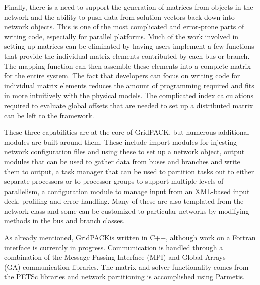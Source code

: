 \documentclass[preprint]{acm_proc_article-sp}
\begin{document}
Finally, there is a need to support the generation of matrices from objects in the
network and the ability to push data from solution vectors back down into
network objects. This is one of the most complicated and error-prone parts of
writing code, especially for parallel platforms. Much of the work involved in
setting up matrices can be eliminated by having users implement a few functions
that provide the individual matrix elements contributed by each bus or branch. The
mapping function can then assemble these elements into a complete matrix for the
entire system. The fact that developers can focus on writing code for individual
matrix elements reduces the amount of programming required and fits in more
intuitively with the physical models. The complicated index calculations
required to evaluate global offsets that are needed to set up a distributed
matrix can be left to the framework.

These three capabilities are at the core of GridPACK\texttrademark, but numerous
additional modules are built around them. These include import modules for injesting
network configuration files and using these to set up a network object, output
modules that can be used to gather data from buses and branches and write them
to output, a task manager that can be used to partition tasks out to either separate
processors or to processor groups to support multiple levels of parallelism, a
configuration module to manage input from an XML-based input deck, profiling and
error handling. Many of these are also templated from the network class  and
some can be customized to particular networks by modifying methods in the bus
and branch classes.

As already mentioned, GridPACK\texttrademark is written in C++, although work
on a Fortran interface is currently in progress. Communication is handled
through a combination of the Message Passing Interface (MPI)\cite{MPI1} and
Global Arrays\\
(GA)\cite{GA} communication libraries. The matrix and solver
functionality comes from the PETSc\cite{PETSC} libraries and network partitioning
is accomplished using Parmetis\cite{PARMETIS}.
\end{document}
